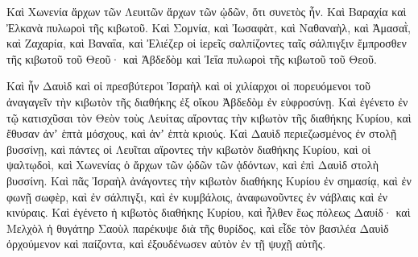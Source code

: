{\par }{\PP {}Καὶ Χωνενία ἄρχων τῶν Λευιτῶν ἄρχων τῶν ᾠδῶν, ὅτι συνετὸς ἦν.
Καὶ Βαραχία καὶ Ἐλκανὰ πυλωροὶ τῆς κιβωτοῦ.
Καὶ Σομνία, καὶ Ἰωσαφὰτ, καὶ Ναθαναὴλ, καὶ Ἀμασαῒ, καὶ Ζαχαρία, καὶ Βαναΐα, καὶ Ἐλιέζερ οἱ ἱερεῖς σαλπίζοντες ταῖς σάλπιγξιν ἔμπροσθεν τῆς κιβωτοῦ τοῦ Θεοῦ· καὶ Ἀβδεδὸμ καὶ Ἰεΐα πυλωροὶ τῆς κιβωτοῦ τοῦ Θεοῦ.
\par }{\PP {}Καὶ ἦν Δαυὶδ καὶ οἱ πρεσβύτεροι Ἰσραὴλ καὶ οἱ χιλίαρχοι οἱ πορευόμενοι τοῦ ἀναγαγεῖν τὴν κιβωτὸν τῆς διαθήκης ἐξ οἴκου Ἀβδεδὸμ ἐν εὐφροσύνῃ.
Καὶ ἐγένετο ἐν τῷ κατισχῦσαι τὸν Θεὸν τοὺς Λευίτας αἴροντας τὴν κιβωτὸν τῆς διαθήκης Κυρίου, καὶ ἔθυσαν ἀνʼ ἑπτὰ μόσχους, καὶ ἀνʼ ἑπτὰ κριούς.
Καὶ Δαυὶδ περιεζωσμένος ἐν στολῇ βυσσίνῃ, καὶ πάντες οἱ Λευῖται αἴροντες τὴν κιβωτὸν διαθήκης Κυρίου, καὶ οἱ ψαλτῳδοὶ, καὶ Χωνενίας ὁ ἄρχων τῶν ᾠδῶν τῶν ᾀδόντων, καὶ ἐπὶ Δαυὶδ στολὴ βυσσίνη.
Καὶ πᾶς Ἰσραὴλ ἀνάγοντες τὴν κιβωτὸν διαθήκης Κυρίου ἐν σημασίᾳ, καὶ ἐν φωνῇ σωφὲρ, καὶ ἐν σάλπιγξι, καὶ ἐν κυμβάλοις, ἀναφωνοῦντες ἐν νάβλαις καὶ ἐν κινύραις.
Καὶ ἐγένετο ἡ κιβωτὸς διαθήκης Κυρίου, καὶ ἦλθεν ἕως πόλεως Δαυίδ· καὶ Μελχὸλ ἡ θυγάτηρ Σαοὺλ παρέκυψε διὰ τῆς θυρίδος, καὶ εἶδε τὸν βασιλέα Δαυὶδ ὀρχούμενον καὶ παίζοντα, καὶ ἐξουδένωσεν αὐτὸν ἐν τῇ ψυχῇ αὐτῆς.

}
